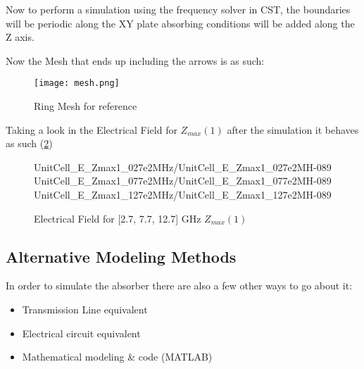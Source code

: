         Now to perform a simulation using the frequency solver in CST, the boundaries will be periodic
        along the XY plate absorbing conditions will be added along the Z axis.

        Now the Mesh that ends up including the arrows is as such:
        \begin{figure}[h]
            \centering
            \texttt{[image: mesh.png]}
            \caption{Ring Mesh for reference}
            \label{img:RingAndArrowMesh}
        \end{figure}

        Taking a look in the Electrical Field for $Z_{max}(1)$ after the simulation
        it behaves as such (\ref{img:E_Zmax1})
        \begin{figure}[h]
            \centering
            {UnitCell_E_Zmax1_027e2MHz/UnitCell_E_Zmax1_027e2MH-}{0}{89}\hfil
            {UnitCell_E_Zmax1_077e2MHz/UnitCell_E_Zmax1_077e2MH-}{0}{89}\hfil
            {UnitCell_E_Zmax1_127e2MHz/UnitCell_E_Zmax1_127e2MH-}{0}{89}
            \caption{Electrical Field for [2.7, 7.7, 12.7] GHz $Z_{max}(1)$}
            \label{img:E_Zmax1}
        \end{figure}
        


    \subsection{\textsf{Alternative Modeling Methods}}
        In order to simulate the absorber there are also a few other ways to go about it:
        \begin{itemize}
            \item Transmission Line equivalent
            \item Electrical circuit equivalent
            \item Mathematical modeling \& code (MATLAB)
        \end{itemize}